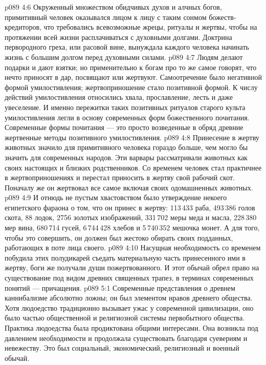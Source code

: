 \vs p089 4:6 Окруженный множеством обидчивых духов и алчных богов, примитивный человек оказывался лицом к лицу с таким сонмом божеств\hyp{}кредиторов, что требовались всевозможные жрецы, ритуалы и жертвы, чтобы на протяжении всей жизни расплачиваться с духовными долгами. Доктрина первородного греха, или расовой вине, вынуждала каждого человека начинать жизнь с большим долгом перед духовными силами.
\vs p089 4:7 \pc Людям делают подарки и дают взятки; но применительно к богам про то же самое говорят, что нечто приносят в дар, посвящают или жертвуют. Самоотречение было негативной формой умилостивления; жертвоприношение стало позитивной формой. К числу действий умилостивления относились хвала, прославление, лесть и даже увеселение. И именно пережитки таких позитивных ритуалов старого культа умилостивления легли в основу современных форм божественного почитания. Современные формы почитания --- это просто возведенные в обряд древние жертвенные методы позитивного умилостивления.
\vs p089 4:8 \pc Принесение в жертву животных значило для примитивного человека гораздо больше, чем могло бы значить для современных народов. Эти варвары рассматривали животных как своих настоящих и близких родственников. Со временем человек стал практичнее в жертвоприношениях и перестал приносить в жертву свой рабочий скот. Поначалу же он жертвовал все самое  включая своих одомашненных животных.
\vs p089 4:9 И отнюдь не пустым хвастовством было утверждение некоего египетского фараона о том, что он принес в жертву: 113\,433 раба, 493\,386 голов скота, 88 лодок, 2756 золотых изображений, 331\,702 меры меда и масла, 228\,380 мер вина, 680\,714 гусей, 6\,744\,428 хлебов и 5\,740\,352 мешочка монет. А для того, чтобы это совершить, он должен был жестоко обирать своих подданных, работающих в поте лица своего.
\vs p089 4:10 Насущная необходимость со временем побудила этих полудикарей съедать материальную часть принесенного ими в жертву, боги же получали души пожертвованного. И этот обычай обрел право на существование под видом древних священных трапез, в терминах современных понятий --- причащения.
\vs p089 5:1 Современные представления о древнем каннибализме абсолютно ложны; он был элементом нравов древнего общества. Хотя людоедство традиционно вызывает ужас у современной цивилизации, оно было частью общественной и религиозной системы первобытного общества. Практика людоедства была продиктована общими интересами. Она возникла под давлением необходимости и продолжала существовать благодаря суевериям и невежеству. Это был социальный, экономический, религиозный и военный обычай.
